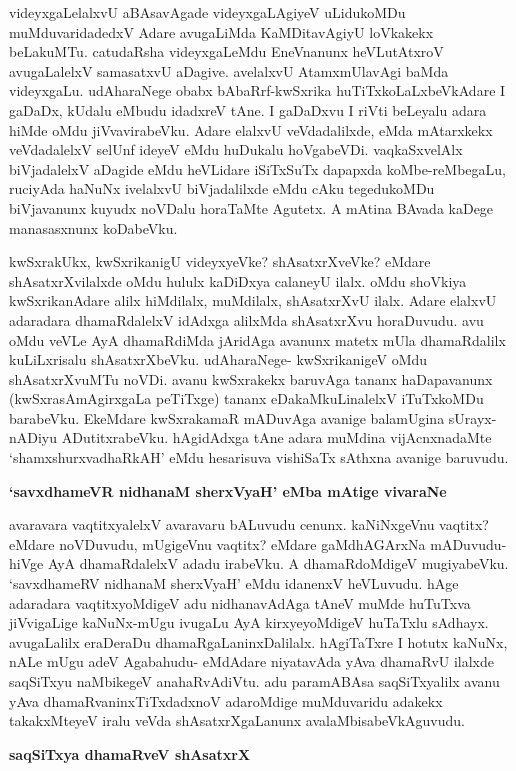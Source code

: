 \noindent
videyxgaLelalxvU aBAsavAgade videyxgaLAgiyeV uLidukoMDu muMduvaridadedxV Adare avugaLiMda KaMDitavAgiyU loVkakekx beLakuMTu. catudaRsha videyxgaLeMdu EneVnanunx heVLutAtxroV avugaLalelxV samasatxvU aDagive. avelalxvU AtamxmUlavAgi baMda videyxgaLu. udAharaNege obabx bAbaRrf-kwSxrika huTiTxkoLaLxbeVkAdare I gaDaDx, kUdalu eMbudu idadxreV tAne. I gaDaDxvu I riVti beLeyalu adara hiMde oMdu jiVvavirabeVku. Adare elalxvU veVdadalilxde, eMda mAtarxkekx veVdadalelxV selUnf ideyeV eMdu huDukalu hoVgabeVDi. vaqkaSxvelAlx biVjadalelxV aDagide eMdu heVLidare iSiTxSuTx dapapxda koMbe-reMbegaLu, ruciyAda haNuNx ivelalxvU biVjadalilxde eMdu cAku tegedukoMDu biVjavanunx kuyudx noVDalu horaTaMte Agutetx. A mAtina BAvada kaDege manasasxnunx koDabeVku. 

kwSxrakUkx, kwSxrikanigU videyxyeVke? shAsatxrXveVke? eMdare shAsatxrXvilalxde oMdu hululx kaDiDxya calaneyU ilalx. oMdu shoVkiya kwSxrikanAdare alilx hiMdilalx, muMdilalx, shAsatxrXvU ilalx. Adare elalxvU adaradara dhamaRdalelxV idAdxga alilxMda shAsatxrXvu horaDuvudu. avu oMdu veVLe AyA dhamaRdiMda jAridAga avanunx matetx mUla dhamaRdalilx kuLiLxrisalu shAsatxrXbeVku. udAharaNege- kwSxrikanigeV oMdu shAsatxrXvuMTu noVDi. avanu kwSxrakekx baruvAga tananx haDapavanunx (kwSxrasAmAgirxgaLa peTiTxge) tananx eDakaMkuLinalelxV iTuTxkoMDu barabeVku. EkeMdare kwSxrakamaR mADuvAga avanige balamUgina sUrayx-nADiyu ADutitxrabeVku. hAgidAdxga tAne adara muMdina vijAcnxnadaMte `shamxshurxvadhaRkAH' eMdu hesarisuva vishiSaTx sAthxna avanige baruvudu.

{\bigskip
\noindent
{\large\bf `savxdhameVR nidhanaM sherxVyaH' eMba mAtige vivaraNe}}\label{197}
\medskip

\noindent
avaravara vaqtitxyalelxV avaravaru bALuvudu cenunx. kaNiNxgeVnu vaqtitx? eMdare noVDuvudu, mUgigeVnu vaqtitx? eMdare gaMdhAGArxNa mADuvudu- hiVge AyA dhamaRdalelxV adadu irabeVku. A dhamaRdoMdigeV mugiyabeVku. `savxdhameRV nidhanaM sherxVyaH' eMdu idanenxV heVLuvudu. hAge adaradara vaqtitxyoMdigeV adu nidhanavAdAga tAneV muMde huTuTxva jiVvigaLige kaNuNx-mUgu ivugaLu AyA kirxyeyoMdigeV huTaTxlu sAdhayx. avugaLalilx eraDeraDu dhamaRgaLaninxDalilalx. hAgiTaTxre I hotutx kaNuNx, nALe mUgu adeV Agabahudu- eMdAdare niyatavAda yAva dhamaRvU ilalxde saqSiTxyu naMbikegeV anahaRvAdiVtu. adu paramABAsa saqSiTxyalilx avanu yAva dhamaRvaninxTiTxdadxnoV adaroMdige muMduvaridu adakekx takakxMteyeV iralu veVda shAsatxrXgaLanunx avalaMbisabeVkAguvudu.

\eject

{\noindent
{\large\bf saqSiTxya dhamaRveV shAsatxrX}}
\medskip

